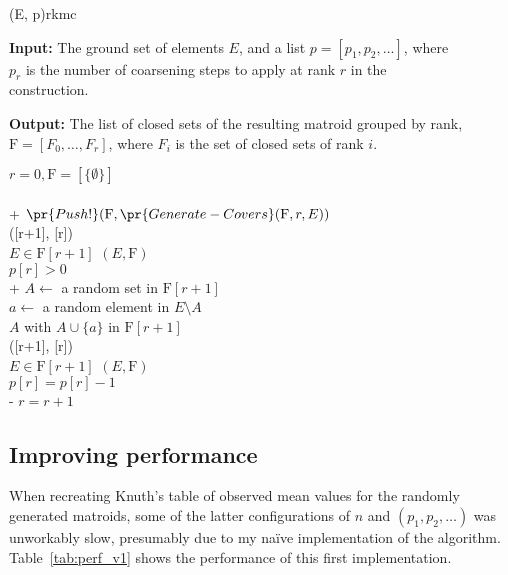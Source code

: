 \begin{algorithm}[float*=ht!]{(E, p)}{rkmc}

  \textbf{Input:}     \tab The ground set of elements $E$, and a list $p = [p_1, p_2, ...]$, where \\
  \mbox{}\tab $p_r$ is the number of coarsening steps to apply at rank $r$ in the \\
  \mbox{}\tab construction.

  \textbf{Output:}    \tab The list of closed sets of the resulting matroid grouped by rank, \\
  \mbox{}\tab $\mathrm{F} = [F_0, \ldots, F_r]$, where $F_i$ is the set of closed sets of rank $i$.

  \begin{pseudo}[label=\small\arabic*, indent-mark, line-height=1.2]
    $r = 0, \mathrm{F} = [\{ \emptyset \}]$ \\
       \\+
      $\pr{Push!}(\mathrm{F}, \pr{Generate-Covers}(\mathrm{F}, r, E))$ \\
      ([r+1], [r]) \\
      
       $E \in \mathrm{F}[r+1]$  $(E, \mathrm{F})$ \\
      
       $p[r] > 0$ \\+
        $A \leftarrow$ a random set in $\mathrm{F}[r+1]$ \\
        $a \leftarrow$ a random element in $E \setminus A$ \\
         $A$ with $A \cup \{a\}$ in $\mathrm{F}[r+1]$ \\
        ([r+1], [r]) \\

         $E \in \mathrm{F}[r+1]$  $(E, \mathrm{F})$ \\

        $p[r] = p[r] - 1$ \\-
      $r = r + 1$

  \end{pseudo}

\end{algorithm}


\subsection{Improving performance}
\label{sec:improving-performance}
When recreating Knuth's table of observed mean values for the randomly generated matroids, some of the latter configurations of $n$ and $(p_1, p_2, \ldots)$ was unworkably slow, presumably due to my naïve implementation of the algorithm. Table~\ref{tab:perf_v1} shows the performance of this first implementation.

